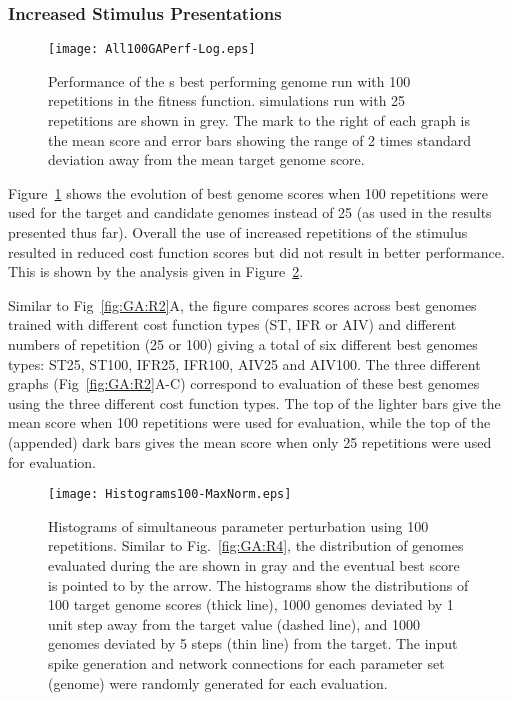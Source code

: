 \subsubsection{Increased Stimulus Presentations}

\begin{figure}[th!]
  \centering
  \texttt{[image: All100GAPerf-Log.eps]}
  \caption{Performance of the {\GA}s best performing genome run with 100
    repetitions in the fitness function. {\GA} simulations run with 25 repetitions are shown in grey. The mark to the right of each graph is the mean
    score and error bars showing the range of 2 times standard
    deviation away from the mean target genome score.}\label{fig:GA:R5}
\end{figure}

Figure~\ref{fig:GA:R5} shows the evolution of best genome scores when 100
repetitions were used for the target and candidate genomes instead of
25 (as used in the results presented thus far). Overall the use of
increased repetitions of the stimulus resulted in reduced cost
function scores but did not result in better {\GA} performance. This is
shown by the analysis given in Figure~\ref{fig:GA:R6}.

\smallskip{}

Similar to Fig~\ref{fig:GA:R2}A, the figure compares scores across best genomes
trained with different cost function types (ST, IFR or AIV) and different
numbers of repetition (25 or 100) giving a total of six different best genomes
types: ST25, ST100, IFR25, IFR100, AIV25 and AIV100. The three different graphs
(Fig~\ref{fig:GA:R2}A-C) correspond to evaluation of these best genomes using the
three different cost function types. The top of the lighter bars give the mean
score when 100 repetitions were used for evaluation, while the top of the
(appended) dark bars gives the mean score when only 25 repetitions were used
for evaluation.

\begin{figure}[th!]
  \centering
  \texttt{[image: Histograms100-MaxNorm.eps]}  
  \caption{Histograms of simultaneous parameter perturbation using 100
    repetitions. Similar to Fig.~\ref{fig:GA:R4}, the distribution of
    genomes evaluated during the {\GA} are shown in gray and the eventual
    best score is pointed to by the arrow. The histograms show the
    distributions of 100 target genome scores (thick line), 1000
    genomes deviated by 1 unit step away from the target value (dashed
    line), and 1000 genomes deviated by 5 steps (thin line) from the
    target. The input spike generation and network connections for
    each parameter set (genome) were randomly generated for each
    evaluation.}
  \label{fig:GA:R6}
\end{figure}

